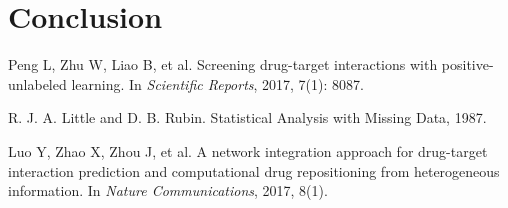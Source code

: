 \documentclass[sigconf,anonymous]{acmart}
\begin{document}
\section{Conclusion}\label{sec:conclusion}


\begin{thebibliography}{10}
Peng L, Zhu W, Liao B, et al. 
\newblock Screening drug-target interactions with positive-unlabeled learning. 
\newblock In {\em Scientific Reports}, 2017, 7(1): 8087.

R. J. A. Little and D. B. Rubin. 
\newblock Statistical Analysis with Missing Data, 1987.

Luo Y, Zhao X, Zhou J, et al. 
\newblock A network integration approach for drug-target interaction prediction and computational drug repositioning from heterogeneous information. 
\newblock In {\em Nature Communications}, 2017, 8(1).

\end{thebibliography}
\end{document}
